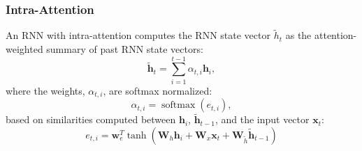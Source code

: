 \documentclass{beamer}
\DeclareMathOperator*{\softmax}{softmax}
\begin{document}
\begin{frame}
  \frametitle{Intra-Attention}

  An RNN with intra-attention computes the RNN state vector
  $\tilde{h}_t$ as the attention-weighted summary of past RNN state
  vectors:
  \begin{displaymath}
    \tilde{\bm{h}}_t = \sum_{i=1}^{t-1} \alpha_{t,i} \bm{h}_i,
  \end{displaymath}
  where the weights, $\alpha_{t,i}$, are softmax normalized:
  \begin{displaymath}
    \alpha_{t,i} = \softmax(e_{t,i}),
  \end{displaymath}
  based on similarities computed between $\bm{h}_i$, $\tilde{\bm{h}}_{t-1}$, and
  the input vector $\bm{x}_t$:
  \begin{displaymath}
    e_{t,i} = \bm{w}_e^T\tanh\left(\bm{W}_h\bm{h}_i+\bm{W}_x\bm{x}_t+\bm{W}_{\tilde{h}}\tilde{\bm{h}}_{t-1}\right)
  \end{displaymath}
\end{frame}
\end{document}
